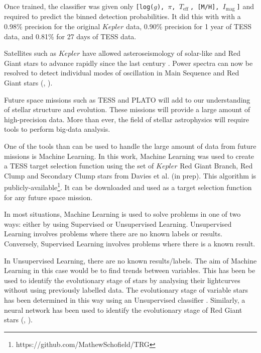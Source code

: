 \documentclass[a4paper,fleqn,usenatbib,useAMS]{mnras}
\newcommand{\teff}{\ensuremath{T_{\textrm{eff}}\:}}
\newcommand{\imag}{\ensuremath{I_{\textrm{mag}}\:}}
\begin{document}
Once trained, the classifier was given only \texttt{[log($g$), $\pi$, \teff, [M/H], \imag]} and required to predict the binned detection probabilities. It did this with with a 0.98\% precision for the original $Kepler$ data, 0.90\% precision for 1 year of TESS data, and 0.81\% for 27 days of TESS data.




\iffalse
Satellites such as $Kepler$ have allowed asteroseismology of solar-like and Red Giant stars to advance rapidly since the last century \citet{chaplin_asteroseismology_2013}. Power spectra can now be resolved to detect individual modes of oscillation in Main Sequence and Red Giant stars (\citet{lund_standing_2017}, \citet{davies_asteroseismology_2016}).

Future space missions such as TESS \citep{ricker_transiting_2014} and PLATO \citep{rauer_plato_2014} will add to our understanding of stellar structure and evolution. These missions will provide a large amount of high-precision data. More than ever, the field of stellar astrophysics will require tools to perform big-data analysis. %

One of the tools than can be used to handle the large amount of data from future missions is Machine Learning. In this work, Machine Learning was used to create a TESS target selection function using the set of $Kepler$ Red Giant Branch, Red Clump and Secondary Clump stars from Davies et al. (in prep). This algorithm is publicly-available\footnote{https://github.com/MathewSchofield/TRG}. It can be downloaded and used as a target selection function for any future space mission.

In most situations, Machine Learning is used to solve problems in one of two ways: either by using Supervised or Unsupervised Learning. Unsupervised Learning involves problems where there are no known labels or results. Conversely, Supervised Learning involves problems where there is a known result.

In Unsupervised Learning, there are no known results/labels. The aim of Machine Learning in this case would be to find trends between variables. This has been be used to identify the evolutionary stage of stars by analysing their lightcurves without using previously labelled data. The evolutionary stage of variable stars has been determined in this way using an Unsupervised classifier \citep{valenzuela_unsupervised_2018}. Similarly, a neural network has been used to identify the evolutionary stage of Red Giant stars (\citet{hon_deep_2017}, \citet{hon_deep_2018}).
\end{document}
